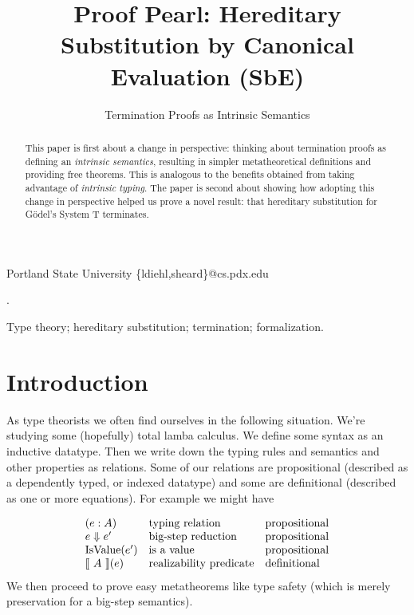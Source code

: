 \documentclass[preprint,nonatbib]{sigplanconf}
\numberwithin{subdefin}{defin}
\numberwithin{subtheorem}{theorem}
\def\bigstep{\Downarrow}
\newcommand{\ascribe}[2]{(#1 : #2)}
\newcommand{\el}[1]{\llbracket ~ #1 ~ \rrbracket}
\newcommand{\fun}[1]{\textmd{#1}}
\begin{document}
\setlength{\pdfpageheight}{\paperheight}
\setlength{\pdfpagewidth}{\paperwidth}


\title{Proof Pearl: Hereditary Substitution by Canonical Evaluation (SbE)}
\subtitle{Termination Proofs as Intrinsic Semantics}

           {Portland State University}
           {\{ldiehl,sheard\}@cs.pdx.edu}

\maketitle

\begin{abstract}
This paper is first about a change in perspective: thinking about
termination proofs as defining an {\it intrinsic semantics}, resulting
in simpler metatheoretical definitions and providing free theorems.
This is analogous to the benefits obtained from taking advantage of
{\it intrinsic typing}.
The paper is second about showing how
adopting this change in perspective helped us prove a novel result:
that hereditary substitution for G{\"o}del's System T terminates.
\end{abstract}

.

\keywords
Type theory; hereditary substitution; termination; formalization.

\section{Introduction}
\label{sec:intro}

As type theorists we often find ourselves in the following situation.
We're studying some (hopefully) total lamba calculus. We define some
syntax as an inductive datatype. Then we write down the typing rules and semantics 
and other properties as relations. Some of our relations are propositional (described as a dependently
typed, or indexed datatype) and some are definitional (described as
one or more equations). For example we might have

\[
\begin{array}{lll}

\ascribe{e}{A} & \mbox{typing relation} & \mbox{propositional}\\
e \bigstep e' & \mbox{big-step reduction} & \mbox{propositional} \\ 
\fun{IsValue}(e') & \mbox{is a value} & \mbox{propositional}\\
{\el{A}(e)} & \mbox{realizability predicate} & \mbox{definitional}\\

\end{array}
\]
We then proceed to prove easy metatheorems like type safety (which is merely
preservation for a big-step semantics).
\end{document}

